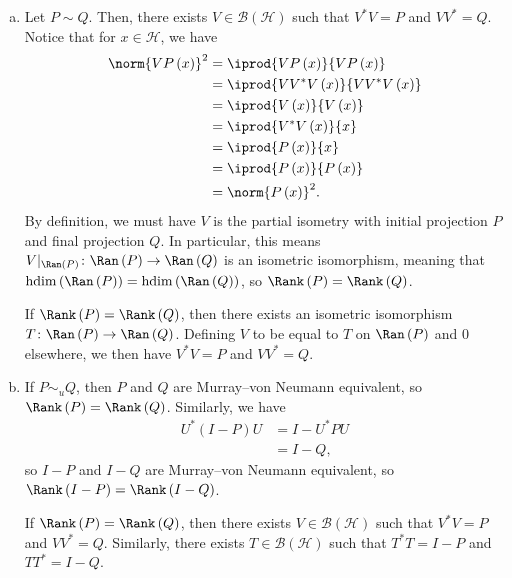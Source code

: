 \documentclass[10pt]{mypackage}
\DeclareMathOperator{\hdim}{hdim}
\begin{document}
\begin{solution}\hfill
  \begin{enumerate}[(a)]
    \item Let $P\sim Q$. Then, there exists $V\in \mathcal{B}\left(\mathcal{H}\right)$ such that $V^{\ast}V = P$ and $VV^{\ast} = Q$. Notice that for $x\in \mathcal{H}$, we have
      \begin{align*}
        \norm{VP\left(x\right)}^2 &= \iprod{VP\left(x\right)}{VP\left(x\right)}\\
                                  &= \iprod{VV^{\ast}V\left(x\right)}{VV^{\ast}V\left(x\right)}\\
                                  &= \iprod{V\left(x\right)}{V\left(x\right)}\\
                                  &= \iprod{V^{\ast}V\left(x\right)}{x}\\
                                  &= \iprod{P\left(x\right)}{x}\\
                                  &= \iprod{P\left(x\right)}{P\left(x\right)}\\
                                  &= \norm{P\left(x\right)}^2.
      \end{align*}
      By definition, we must have $V$ is the partial isometry with initial projection $P$ and final projection $Q$. In particular, this means $V|_{\Ran\left(P\right)}\colon \Ran\left(P\right)\rightarrow \Ran\left(Q\right)$ is an isometric isomorphism, meaning that $\hdim\left(\Ran\left(P\right)\right) =\hdim\left(\Ran\left(Q\right)\right)$, so $\Rank\left(P\right) = \Rank\left(Q\right)$.\newline

      If $\Rank\left(P\right) = \Rank\left(Q\right)$, then there exists an isometric isomorphism $T\colon \Ran\left(P\right)\rightarrow \Ran\left(Q\right)$. Defining $V$ to be equal to $T$ on $\Ran\left(P\right)$ and $0$ elsewhere, we then have $V^{\ast}V = P$ and $VV^{\ast} = Q$.
    \item If $P\sim_{u}Q$, then $P$ and $Q$ are Murray--von Neumann equivalent, so $\Rank\left(P\right) = \Rank\left(Q\right)$. Similarly, we have
      \begin{align*}
        U^{\ast}\left(I-P\right)U &= I-U^{\ast}PU\\
                                  &= I-Q,
      \end{align*}
      so $I-P$ and $I-Q$ are Murray--von Neumann equivalent, so $\Rank\left(I-P\right) = \Rank\left(I-Q\right)$.\newline

      If $\Rank\left(P\right) = \Rank\left(Q\right)$, then there exists $V\in \mathcal{B}\left(\mathcal{H}\right)$ such that $V^{\ast}V = P$ and $VV^{\ast} = Q$. Similarly, there exists $T\in \mathcal{B}\left(\mathcal{H}\right)$ such that $T^{\ast}T = I-P$ and $TT^{\ast} = I-Q$.
  \end{enumerate}
\end{solution}
\end{document}
